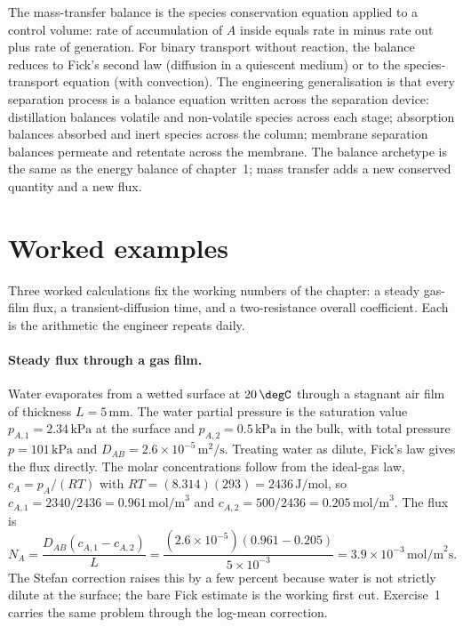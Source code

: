 \begin{archetype}[Balance]
The mass-transfer balance is the species conservation equation
applied to a control volume: rate of accumulation of $A$ inside
equals rate in minus rate out plus rate of generation. For binary
transport without reaction, the balance reduces to Fick's second law
(diffusion in a quiescent medium) or to the species-transport
equation (with convection). The engineering generalisation is that
every separation process is a balance equation written across the
separation device: distillation balances volatile and non-volatile
species across each stage; absorption balances absorbed and inert
species across the column; membrane separation balances permeate and
retentate across the membrane. The balance archetype is the same as
the energy balance of chapter~1; mass transfer adds a new conserved
quantity and a new flux.
\end{archetype}

\section{Worked examples}

Three worked calculations fix the working numbers of the chapter: a
steady gas-film flux, a transient-diffusion time, and a two-resistance
overall coefficient. Each is the arithmetic the engineer repeats daily.

\paragraph{Steady flux through a gas film.} Water evaporates from a
wetted surface at $20\,\degC$ through a stagnant air film of thickness
$L = 5\,\si{\milli\meter}$. The water partial pressure is the
saturation value $p_{A,1} = 2.34\,\text{kPa}$ at the surface and
$p_{A,2} = 0.5\,\text{kPa}$ in the bulk, with total pressure
$p = 101\,\text{kPa}$ and $D_{AB} = 2.6\times 10^{-5}\,\si{\meter
\squared\per\second}$. Treating water as dilute, Fick's law gives the
flux directly. The molar concentrations follow from the ideal-gas law,
$c_{A} = p_A/(RT)$ with $RT = (8.314)(293) = 2436\,\text{J/mol}$, so
$c_{A,1} = 2340/2436 = 0.961\,\text{mol/m}^3$ and $c_{A,2} =
500/2436 = 0.205\,\text{mol/m}^3$. The flux is
\[
N_A = \frac{D_{AB}(c_{A,1}-c_{A,2})}{L} = \frac{(2.6\times 10^{-5})
(0.961-0.205)}{5\times 10^{-3}} = 3.9\times 10^{-3}\,\text{mol/m}^2
\text{s}.
\]
The Stefan correction raises this by a few percent because water is
not strictly dilute at the surface; the bare Fick estimate is the
working first cut. Exercise~1 carries the same problem through the
log-mean correction.

